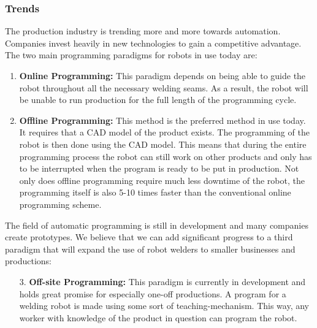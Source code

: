 \subsubsection{Trends}
The production industry is trending more and more towards automation.
Companies invest heavily in new technologies to gain a competitive advantage. 
The two main programming paradigms for robots in use today are:
\begin{enumerate}
\item \textbf{Online Programming:} This paradigm depends on being able to guide the robot throughout all the necessary welding seams. As a result, the robot will be unable to run production for the full length of the programming cycle.
\item \textbf{Offline Programming:} This method is the preferred method in use today. It requires that a CAD model of the product exists. The programming of the robot is then done using the CAD model. This means that during the entire programming process the robot can still work on other products and only has to be interrupted when the program is ready to be put in production. Not only does offline programming require much less downtime of the robot, the programming itself is also 5-10 times faster than the conventional online programming scheme.	
\end{enumerate}
The field of automatic programming is still in development and many companies create prototypes. We believe that we can add significant progress to a third paradigm that will expand the use of robot welders to smaller businesses and productions:
\begin{enumerate}
	\item[3.]{\textbf{Off-site Programming:}} This paradigm is currently in development and holds great promise for especially one-off productions. A program for a welding robot is made using some sort of teaching-mechanism. 
	This way, any worker with knowledge of the product in question can program the robot.
\end{enumerate}